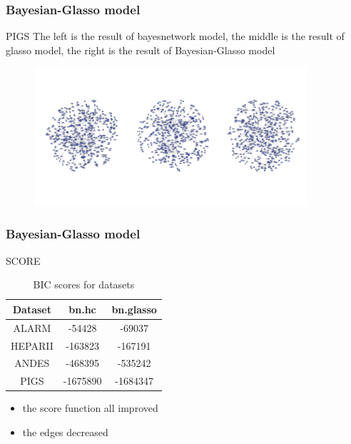\documentclass{beamer}
\begin{document}
\begin{frame}
\frametitle{Bayesian-Glasso model}
  \begin{block}{PIGS}
  The left is the result of bayesnetwork model, the middle is the result of glasso model, the right is the result of Bayesian-Glasso model
 \begin{center}
 \begin{figure}
     \includegraphics[width=0.9\textwidth, height=0.7\textheight]{pigs.jpeg}

    \end{figure}
\end{center}
  \end{block}


\end{frame}

\begin{frame}
\frametitle{Bayesian-Glasso model}
  \begin{block}{SCORE}
\begin{table}[h!]\large
  \caption{BIC scores for datasets}
\begin{center}
    \begin{tabular}{| c | c| c | }
    \hline
    Dataset& bn.hc &  bn.glasso\\
    \hline
ALARM &-54428&-69037\\
HEPARII&-163823&-167191\\
ANDES&-468395&-535242\\
PIGS &-1675890&-1684347\\
\hline
\end{tabular}
  \end{center}
\end{table}
\end{block}


\begin{block}
\begin{itemize}
\item the score function all improved
\item the edges decreased

\end{itemize}

\end{block}
\end{frame}
\end{document}
